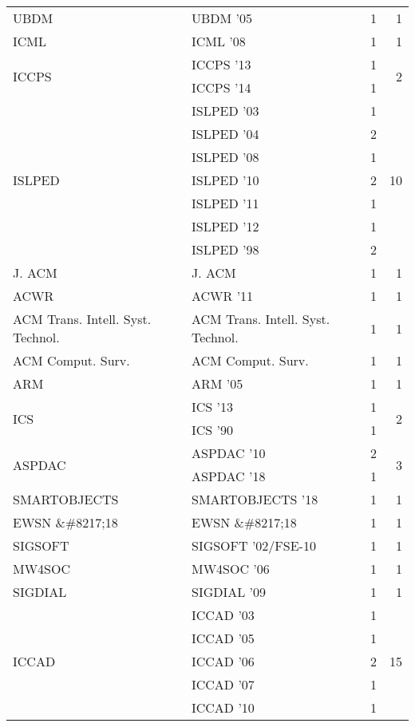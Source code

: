 \begin{table*}[t]
\begin{tabular}{llrr}
\multirow{1}{*}{UBDM } & UBDM '05 & 1 & \multirow{1}{*}{1}\\
\multirow{1}{*}{ICML } & ICML '08 & 1 & \multirow{1}{*}{1}\\
\multirow{2}{*}{ICCPS } & ICCPS '13 & 1 & \multirow{2}{*}{2}\\
& ICCPS '14 & 1 &\\
\multirow{7}{*}{ISLPED } & ISLPED '03 & 1 & \multirow{7}{*}{10}\\
& ISLPED '04 & 2 &\\
& ISLPED '08 & 1 &\\
& ISLPED '10 & 2 &\\
& ISLPED '11 & 1 &\\
& ISLPED '12 & 1 &\\
& ISLPED '98 & 2 &\\
\multirow{1}{*}{J. ACM} & J. ACM & 1 & \multirow{1}{*}{1}\\
\multirow{1}{*}{ACWR } & ACWR '11 & 1 & \multirow{1}{*}{1}\\
\multirow{1}{*}{ACM Trans. Intell. Syst. Technol.} & ACM Trans. Intell. Syst. Technol. & 1 & \multirow{1}{*}{1}\\
\multirow{1}{*}{ACM Comput. Surv.} & ACM Comput. Surv. & 1 & \multirow{1}{*}{1}\\
\multirow{1}{*}{ARM } & ARM '05 & 1 & \multirow{1}{*}{1}\\
\multirow{2}{*}{ICS } & ICS '13 & 1 & \multirow{2}{*}{2}\\
& ICS '90 & 1 &\\
\multirow{2}{*}{ASPDAC } & ASPDAC '10 & 2 & \multirow{2}{*}{3}\\
& ASPDAC '18 & 1 &\\
\multirow{1}{*}{SMARTOBJECTS } & SMARTOBJECTS '18 & 1 & \multirow{1}{*}{1}\\
\multirow{1}{*}{EWSN \&\#8217;18} & EWSN \&\#8217;18 & 1 & \multirow{1}{*}{1}\\
\multirow{1}{*}{SIGSOFT } & SIGSOFT '02/FSE-10 & 1 & \multirow{1}{*}{1}\\
\multirow{1}{*}{MW4SOC } & MW4SOC '06 & 1 & \multirow{1}{*}{1}\\
\multirow{1}{*}{SIGDIAL } & SIGDIAL '09 & 1 & \multirow{1}{*}{1}\\
\multirow{12}{*}{ICCAD } & ICCAD '03 & 1 & \multirow{12}{*}{15}\\
& ICCAD '05 & 1 &\\
& ICCAD '06 & 2 &\\
& ICCAD '07 & 1 &\\
& ICCAD '10 & 1 &\\

\end{tabular}
\end{table*}
